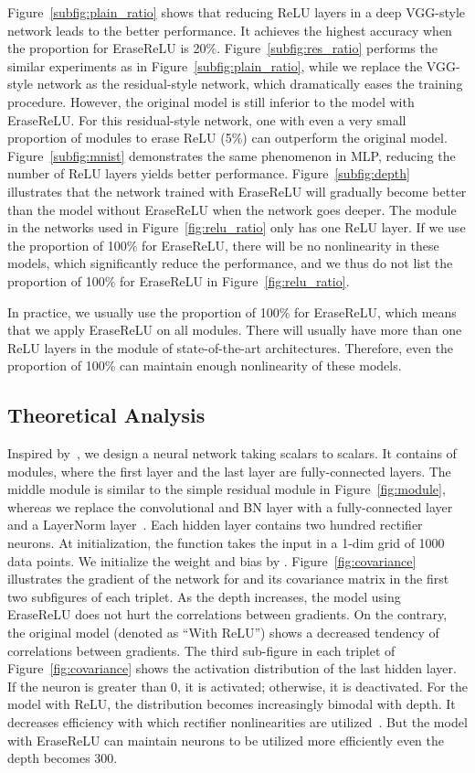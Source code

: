 \documentclass[10pt,twocolumn,letterpaper]{article}
\begin{document}
Figure~\ref{subfig:plain_ratio} shows that reducing ReLU layers in a deep VGG-style network leads to the better performance.
It achieves the highest accuracy when the proportion for EraseReLU is 20\%.
Figure~\ref{subfig:res_ratio} performs the similar experiments as in Figure~\ref{subfig:plain_ratio}, while we replace the VGG-style network as the residual-style network, which dramatically eases the training procedure.
However, the original model is still inferior to the model with EraseReLU.
For this residual-style network, one with even a very small proportion of modules to erase ReLU (5\%) can outperform the original model.
Figure~\ref{subfig:mnist} demonstrates the same phenomenon in MLP, reducing the number of ReLU layers yields better performance.
Figure~\ref{subfig:depth} illustrates that the network trained with EraseReLU will gradually become better than the model without EraseReLU when the network goes deeper.
The module in the networks used in Figure~\ref{fig:relu_ratio} only has one ReLU layer.
If we use the proportion of 100\% for EraseReLU, there will be no nonlinearity in these models, which significantly reduce the performance, and we thus do not list the proportion of 100\% for EraseReLU in Figure~\ref{fig:relu_ratio}.

In practice, we usually use the proportion of 100\% for EraseReLU, which means that we apply EraseReLU on all modules.
There will usually have more than one ReLU layers in the module of state-of-the-art architectures.
Therefore, even the proportion of 100\% can maintain enough nonlinearity of these models. 



\subsection{Theoretical Analysis}
Inspired by~\cite{balduzzi2017shattered}, we design a neural network  taking scalars to scalars.
It contains of  modules, where the first layer and the last layer are fully-connected layers.
The middle module is similar to the simple residual module in Figure~\ref{fig:module}, whereas we replace the convolutional and BN layer with a fully-connected layer and a LayerNorm layer~\cite{ba2016layer}. Each hidden layer contains two hundred rectifier neurons.
At initialization, the function  takes the input  in a 1-dim grid of 1000 data points. We initialize the weight and bias by \cite{he2015delving}.
Figure~\ref{fig:covariance} illustrates the gradient of the network for  and its covariance matrix in the first two subfigures of each triplet.
As the depth increases, the model using EraseReLU does not hurt the correlations between gradients.
On the contrary, the original model (denoted as ``With ReLU'') shows a decreased tendency of correlations between gradients.
The third sub-figure in each triplet of Figure~\ref{fig:covariance} shows the activation distribution of the last hidden layer.
If the neuron is greater than 0, it is activated; otherwise, it is deactivated.
For the model with ReLU, the distribution becomes increasingly bimodal with depth.
It decreases efficiency with which rectifier nonlinearities are utilized~\cite{balduzzi2017shattered}.
But the model with EraseReLU can maintain neurons to be utilized more efficiently even the depth becomes 300.
\end{document}
